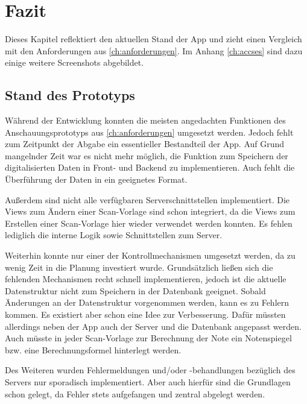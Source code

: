 \documentclass[notables, nomenclature, oneside, 150]{HSMW-Thesis}
\begin{document}

\chapter{Fazit}\label{ch:fazit}
	Dieses Kapitel reflektiert den aktuellen Stand der App und zieht einen Vergleich mit den Anforderungen aus \autoref{ch:anforderungen}. Im Anhang \autoref{ch:accses} sind dazu einige weitere Screenshots abgebildet.
	
	\section{Stand des Prototyps}
		Während der Entwicklung konnten die meisten angedachten Funktionen des Anschauungsprototyps aus \autoref{ch:anforderungen} umgesetzt werden. Jedoch fehlt zum Zeitpunkt der Abgabe ein essentieller Bestandteil der App. Auf Grund mangelnder Zeit war es nicht mehr möglich, die Funktion zum Speichern der digitalisierten Daten in Front- und Backend zu implementieren. Auch fehlt die Überführung der Daten in ein geeignetes Format.
		
		Außerdem sind nicht alle verfügbaren Serverschnittstellen implementiert. Die Views zum Ändern einer Scan-Vorlage sind schon integriert, da die Views zum Erstellen einer Scan-Vorlage hier wieder verwendet werden konnten. Es fehlen lediglich die interne Logik sowie Schnittstellen zum Server.	
		
		Weiterhin konnte nur einer der Kontrollmechanismen umgesetzt werden, da zu wenig Zeit in die Planung investiert wurde. Grundsätzlich ließen sich die fehlenden Mechanismen recht schnell implementieren, jedoch ist die aktuelle Datenstruktur nicht zum Speichern in der Datenbank geeignet. Sobald Änderungen an der Datenstruktur vorgenommen werden, kann es zu Fehlern kommen. Es existiert aber schon eine Idee zur Verbesserung. Dafür müssten allerdings neben der App auch der Server und die Datenbank angepasst werden. Auch müsste in jeder Scan-Vorlage zur Berechnung der Note ein Notenspiegel bzw. eine Berechnungsformel hinterlegt werden.
		
		Des Weiteren wurden Fehlermeldungen und/oder -behandlungen bezüglich des Servers nur sporadisch implementiert. Aber auch hierfür sind die Grundlagen schon gelegt, da Fehler stets aufgefangen und zentral abgelegt werden. 
	
%	
%	
%	
%	
%	
%	
\end{document}
